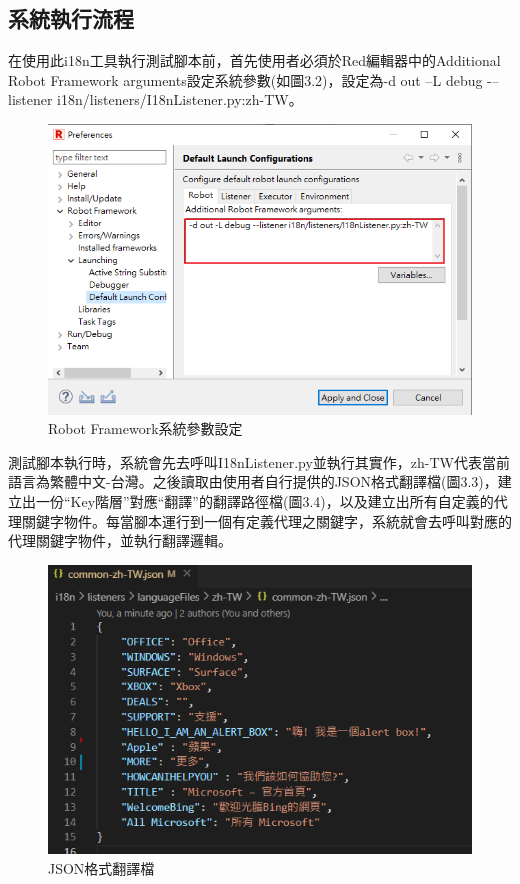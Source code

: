 \subsection{系統執行流程}
在使用此i18n工具執行測試腳本前，首先使用者必須於Red編輯器\cite{red}中的Additional Robot Framework arguments設定系統參數(如圖3.2)，設定為-d out –L debug -–listener i18n/listeners/I18nListener.py:zh-TW。

\begin{figure}[H]
\includegraphics[width= 1.1\textwidth]{../論文截圖/3-1-3-1 設定系統參數.png}
\caption{Robot Framework系統參數設定}
\end{figure}

測試腳本執行時，系統會先去呼叫I18nListener.py並執行其實作，zh-TW代表當前語言為繁體中文-台灣。之後讀取由使用者自行提供的JSON格式翻譯檔(圖3.3)，建立出一份“Key階層”對應“翻譯”的翻譯路徑檔(圖3.4)，以及建立出所有自定義的代理關鍵字物件。每當腳本運行到一個有定義代理之關鍵字，系統就會去呼叫對應的代理關鍵字物件，並執行翻譯邏輯。

\begin{figure}[H]
\includegraphics[width= \textwidth]{../論文截圖/3-1-3-2 JSON格式翻譯檔.png}
\caption{JSON格式翻譯檔}
\end{figure}

